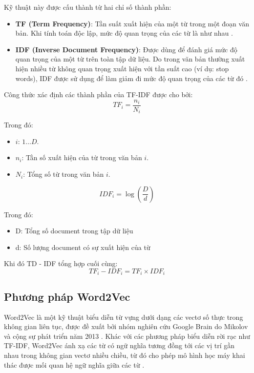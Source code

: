 Kỹ thuật này được cấu thành từ hai chỉ số thành phần:
\begin{itemize}
\item \textbf{TF (Term Frequency)}: Tần suất xuất hiện của một từ trong một đoạn văn bản. Khi tính toán độc lập, mức độ quan trọng của các từ là như nhau \cite{singh2018natural}. 

\item \textbf{IDF (Inverse Document Frequency)}: Được dùng để đánh giá mức độ quan trọng của một từ trên toàn tập dữ liệu. Do trong văn bản thường xuất hiện nhiều từ không quan trọng xuất hiện với tần suất cao (ví dụ: stop words), IDF được sử dụng để làm giảm đi mức độ quan trọng của các từ đó \cite{singh2018natural}. 
\end{itemize}
Công thức xác định các thành phần của TF-IDF được cho bởi:
\begin{equation}
	TF_i = \frac{n_i}{N_i}
\end{equation}

Trong đó:
\begin{itemize}
	\item $i$: $1 \dots D$.
	\item $n_i$: Tần số xuất hiện của từ trong văn bản $i$.
	\item $N_i$: Tổng số từ trong văn bản $i$.
\end{itemize}
\begin{equation}
	IDF_i = \log(\frac{D}{d})
\end{equation}

Trong đó:
\begin{itemize}
	\item D: Tổng số document trong tập dữ liệu
	\item d: Số lượng document có sự xuất hiện của từ
\end{itemize}

Khi đó TD - IDF tổng hợp cuối cùng:
\begin{equation}
	TF_i - IDF_i = TF_i\times{IDF_i}
\end{equation}

\subsection{Phương pháp Word2Vec}

Word2Vec là một kỹ thuật biểu diễn từ vựng dưới dạng các vectơ số thực trong không gian liên tục, được đề xuất bởi nhóm nghiên cứu Google Brain do Mikolov và cộng sự phát triển năm 2013 \cite{mikolov2013efficient}. Khác với các phương pháp biểu diễn rời rạc như TF-IDF, Word2Vec ánh xạ các từ có ngữ nghĩa tương đồng tới các vị trí gần nhau trong không gian vectơ nhiều chiều, từ đó cho phép mô hình học máy khai thác được mối quan hệ ngữ nghĩa giữa các từ \cite{mikolov2013efficient}.

